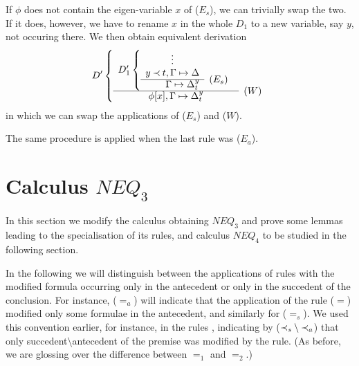 \begin{PROOF}
\begin{LS}
If $\phi$ does not contain the eigen-variable $x$ of ($E_s$), we can
trivially swap the two. If it does, however, we have to rename $x$ in the
whole $D_1$ to a new variable, say $y$, not occuring there. We then obtain
equivalent derivation 
\[ D' \left \{ \begin{array}{cl}
 D_1' \left \{ \begin{array}{rl}
 \multicolumn{1}{c}{\vdots} \\
 y\Incl t,  \GSD \\ \cline{1-1}
  \GSD_t^y & \rabove{(E_s)} \end{array} \right . \\ \cline{1-1}
 \phi[x], \GSD_t^y & \rabove{(W)} \end{array} \right . \]
in which we can swap the applications of ($E_s$) and ($W$). \\
\item The same procedure is applied when the last rule was ($E_a$).
\end{LS}
\end{PROOF}

\section{Calculus $NEQ_3$}
In this section we modify the calculus obtaining $NEQ_3$ and prove
some lemmas leading to the specialisation of its rules, and calculus $NEQ_4$
to be studied in the following section.

In the following we will distinguish between the applications of rules with 
the modified formula occurring only in the antecedent or only in the succedent
of the conclusion. For instance, ($=_{a}$) will indicate that the application
of the rule ($=$) modified only some formulae in the antecedent, and similarly
for ($=_{s}$). We used this convention earlier, for instance, 
in the rules , 
indicating by ($\mathbin{\prec}_s\setminus \mathbin{\prec}_a$) that only succedent$\setminus$antecedent
 of the premise was modified by the rule. (As before, we are glossing over the 
difference between $=_1$ and $=_2$.)

